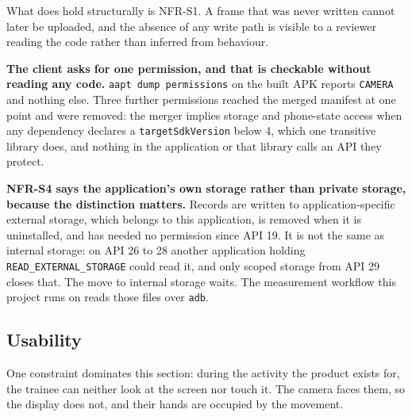 What does hold structurally is NFR-S1. A frame that was never written cannot later be uploaded, and the absence of any write path is visible to a reviewer reading the code rather than inferred from behaviour.

\textbf{The client asks for one permission, and that is checkable without reading any code.} \texttt{aapt dump \allowbreak{}permission\allowbreak{}s} on the built APK reports \texttt{CAMERA} and nothing else. Three further permissions reached the merged manifest at one point and were removed: the merger implies storage and phone-state access when any dependency declares a \texttt{target\allowbreak{}Sdk\allowbreak{}Version} below 4, which one transitive library does, and nothing in the application or that library calls an API they protect.

\textbf{NFR-S4 says the application's own storage rather than private storage, because the distinction matters.} Records are written to application-specific external storage, which belongs to this application, is removed when it is uninstalled, and has needed no permission since API 19. It is not the same as internal storage: on API 26 to 28 another application holding \texttt{READ\_\allowbreak{}EXTERNAL\_\allowbreak{}STORAGE} could read it, and only scoped storage from API 29 closes that. The move to internal storage waits. The measurement workflow this project runs on reads those files over \texttt{adb}.

\subsection{Usability}
\label{sec:3.4.5}

One constraint dominates this section: during the activity the product exists for, the trainee can neither look at the screen nor touch it. The camera faces them, so the display does not, and their hands are occupied by the movement.

